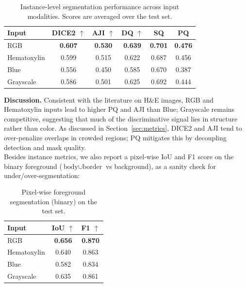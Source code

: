 \documentclass[target=bach,aauheader=,style=]{thud}
\begin{document}
\begin{table}[ht]
\centering
\caption{Instance-level segmentation performance across input modalities. Scores are averaged over the test set.}
\label{tab:iou-results}
\small
\begin{tabular}{lccccc}
\toprule
\textbf{Input} & \textbf{DICE2} $\uparrow$ & \textbf{AJI} $\uparrow$ & \textbf{DQ} $\uparrow$ & \textbf{SQ} & \textbf{PQ}\\
\midrule
RGB         & \textbf{0.607} & \textbf{0.530} & \textbf{0.639} & \textbf{0.701} & \textbf{0.476}\\
Hematoxylin & 0.599 & 0.515 & 0.622 & 0.687 & 0.456\\
Blue        & 0.556 & 0.450 & 0.585 & 0.670 & 0.387\\
Grayscale   & 0.586 & 0.501 & 0.625 & 0.692 & 0.444\\
\bottomrule
\end{tabular}
\end{table}

\noindent\textbf{Discussion.} 
Consistent with the literature on H\&E images, RGB and Hematoxylin inputs lead to higher PQ and AJI than Blue; Grayscale remains competitive, suggesting that much of the discriminative signal lies in structure rather than color. 
As discussed in Section~\ref{sec:metrics}, DICE2 and AJI tend to over-penalize overlaps in crowded regions; PQ mitigates this by decoupling detection and mask quality.\\

Besides instance metrics, we also report a pixel-wise IoU and F1 score on the binary foreground ($\text{body}\cup\text{border}$ vs background), as a sanity check for under/over-segmentation:

\begin{table}[ht]
\centering
\caption{Pixel-wise foreground segmentation (binary) on the test set.}
\label{tab:pix-binary}
\small
\begin{tabular}{lcc}
\toprule
\textbf{Input} & \textbf{IoU} $\uparrow$ & \textbf{F1} $\uparrow$ \\
\midrule
RGB         & \textbf{0.656} & \textbf{0.870} \\
Hematoxylin & 0.640 & 0.863 \\
Blue        & 0.582 & 0.834 \\
Grayscale   & 0.635 & 0.861 \\
\bottomrule
\end{tabular}
\end{table}
\end{document}
